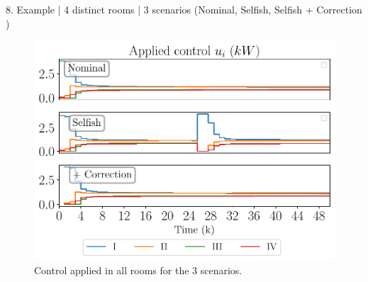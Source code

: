 \documentclass[presentation]{beamer}
\begin{document}
\begin{frame}
\begin{textblock}{15.6}
\begin{block}{8. Example | 4 distinct rooms | 3 scenarios (Nominal, Selfish, Selfish + Correction ) }
\begin{minipage}[c]{26cm}
\begin{figure}[h]
          \includegraphics[width=\textwidth]{../img/airtemp_roomI/control_poster.pdf}
          \caption{\centering Control applied in all rooms for the 3 scenarios.}\label{fig:control_3Scenarios}
        \end{figure}
      \end{minipage}
      \hfill
    \end{block}
  \end{textblock}

\end{frame}
\end{document}
